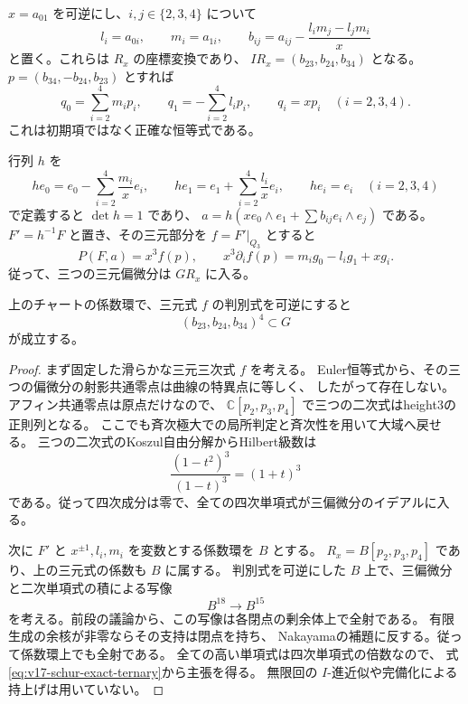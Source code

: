 $x=a_{01}$ を可逆にし、$i,j\in\{2,3,4\}$ について
\[
 l_i=a_{0i},\qquad m_i=a_{1i},\qquad
 b_{ij}=a_{ij}-\frac{l_im_j-l_jm_i}{x}
\]
と置く。これらは $R_x$ の座標変換であり、
$I R_x=(b_{23},b_{24},b_{34})$ となる。
$p=(b_{34},-b_{24},b_{23})$ とすれば
\begin{equation}\label{eq:v17-schur-linear-pfaffian}
 q_0=\sum_{i=2}^4m_ip_i,\qquad
 q_1=-\sum_{i=2}^4l_ip_i,\qquad
 q_i=xp_i\quad(i=2,3,4).
\end{equation}
これは初期項ではなく正確な恒等式である。

行列 $h$ を
\[
 he_0=e_0-\sum_{i=2}^4\frac{m_i}{x}e_i,\qquad
 he_1=e_1+\sum_{i=2}^4\frac{l_i}{x}e_i,\qquad
 he_i=e_i\quad(i=2,3,4)
\]
で定義すると $\det h=1$ であり、
$a=h(xe_0\wedge e_1+\sum b_{ij}e_i\wedge e_j)$ である。
$F'=h^{-1}F$ と置き、その三元部分を $f=F'|_{Q_3}$ とすると
\begin{equation}\label{eq:v17-schur-exact-ternary}
 P(F,a)=x^3f(p),\qquad
 x^3\partial_i f(p)=m_ig_0-l_ig_1+xg_i.
\end{equation}
従って、三つの三元偏微分は $G R_x$ に入る。

\begin{lemma}[滑らかな三元三次式では横断四次以上を消せる]
\label{lem:v17-smooth-ternary-fourth-power}
上のチャートの係数環で、三元式 $f$ の判別式を可逆にすると
\begin{equation}\label{eq:v17-normal-fourth-in-gradient}
 (b_{23},b_{24},b_{34})^4\subset G
\end{equation}
が成立する。
\end{lemma}

\begin{proof}
まず固定した滑らかな三元三次式 $f$ を考える。
Euler恒等式から、その三つの偏微分の射影共通零点は曲線の特異点に等しく、
したがって存在しない。アフィン共通零点は原点だけなので、
$\mathbb C[p_2,p_3,p_4]$ で三つの二次式はheight3の正則列となる。
ここでも斉次極大での局所判定と斉次性を用いて大域へ戻せる。
三つの二次式のKoszul自由分解からHilbert級数は
\[
 \frac{(1-t^2)^3}{(1-t)^3}=(1+t)^3
\]
である。従って四次成分は零で、全ての四次単項式が三偏微分のイデアルに入る。

次に $F'$ と $x^{\pm1},l_i,m_i$ を変数とする係数環を $B$ とする。
$R_x=B[p_2,p_3,p_4]$ であり、上の三元式の係数も $B$ に属する。
判別式を可逆にした $B$ 上で、三偏微分と二次単項式の積による写像
\[
 B^{18}\longrightarrow B^{15}
\]
を考える。前段の議論から、この写像は各閉点の剰余体上で全射である。
有限生成の余核が非零ならその支持は閉点を持ち、
Nakayamaの補題に反する。従って係数環上でも全射である。
全ての高い単項式は四次単項式の倍数なので、
式\eqref{eq:v17-schur-exact-ternary}から主張を得る。
無限回の $I$-進近似や完備化による持上げは用いていない。
\end{proof}

